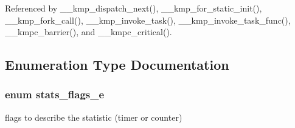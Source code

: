 Referenced by \-\_\-\-\_\-kmp\-\_\-dispatch\-\_\-next(), \-\_\-\-\_\-kmp\-\_\-for\-\_\-static\-\_\-init(), \-\_\-\-\_\-kmp\-\_\-fork\-\_\-call(), \-\_\-\-\_\-kmp\-\_\-invoke\-\_\-task(), \-\_\-\-\_\-kmp\-\_\-invoke\-\_\-task\-\_\-func(), \-\_\-\-\_\-kmpc\-\_\-barrier(), and \-\_\-\-\_\-kmpc\-\_\-critical().



\subsection{Enumeration Type Documentation}
\hypertarget{group__STATS__GATHERING_ga438c2840cc2d516238ea3eb0f4c116b3}{
\subsubsection[{stats\-\_\-flags\-\_\-e}]{\setlength{\rightskip}{0pt plus 5cm}enum {\bf stats\-\_\-flags\-\_\-e}}}\label{group__STATS__GATHERING_ga438c2840cc2d516238ea3eb0f4c116b3}


flags to describe the statistic (timer or counter) 

